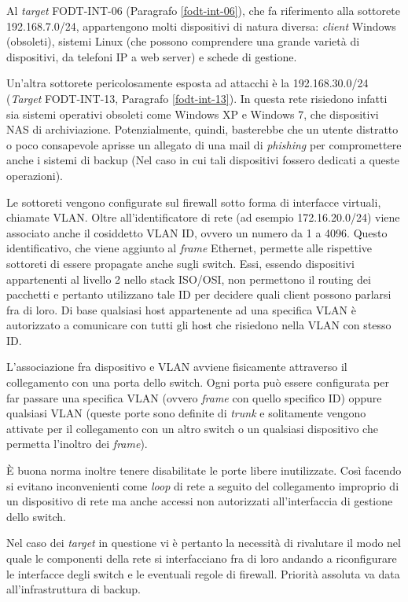 \documentclass[target=bach,aauheader=]{thud}
\begin{document}
Al \textit{target} FODT-INT-06 (Paragrafo \ref{fodt-int-06}), che fa riferimento alla sottorete 192.168.7.0/24, appartengono molti dispositivi di natura diversa: \textit{client} Windows (obsoleti), sistemi Linux (che possono comprendere una grande varietà di dispositivi, da telefoni IP a web server) e schede di gestione.

Un'altra sottorete pericolosamente esposta ad attacchi è la 192.168.30.0/24 (\textit{Target} FODT-INT-13, Paragrafo \ref{fodt-int-13}). In questa rete risiedono infatti sia sistemi operativi obsoleti come Windows XP e Windows 7, che dispositivi NAS di archiviazione. Potenzialmente, quindi, basterebbe che un utente distratto o poco consapevole aprisse un allegato di una mail di \textit{phishing} per compromettere anche i sistemi di backup (Nel caso in cui tali dispositivi fossero dedicati a queste operazioni).

Le sottoreti vengono configurate sul firewall sotto forma di interfacce virtuali, chiamate VLAN. Oltre all'identificatore di rete (ad esempio 172.16.20.0/24) viene associato anche il cosiddetto VLAN ID, ovvero un numero da 1 a 4096. Questo identificativo, che viene aggiunto al \textit{frame} Ethernet, permette alle rispettive sottoreti di essere propagate anche sugli switch. Essi, essendo dispositivi appartenenti al livello 2 nello stack ISO/OSI, non permettono il routing dei pacchetti e pertanto utilizzano tale ID per decidere quali client possono parlarsi fra di loro. Di base qualsiasi host appartenente ad una specifica VLAN è autorizzato a comunicare con tutti gli host che risiedono nella VLAN con stesso ID.

L'associazione fra dispositivo e VLAN avviene fisicamente attraverso il collegamento con una porta dello switch. Ogni porta può essere configurata per far passare una specifica VLAN (ovvero \textit{frame} con quello specifico ID) oppure qualsiasi VLAN (queste porte sono definite di \textit{trunk} e solitamente vengono attivate per il collegamento con un altro switch o un qualsiasi dispositivo che permetta l'inoltro dei \textit{frame}).

È buona norma inoltre tenere disabilitate le porte libere inutilizzate. Così facendo si evitano inconvenienti come \textit{loop} di rete a seguito del collegamento improprio di un dispositivo di rete ma anche accessi non autorizzati all'interfaccia di gestione dello switch. 

Nel caso dei \textit{target} in questione vi è pertanto la necessità di rivalutare il modo nel quale le componenti della rete si interfacciano fra di loro andando a riconfigurare le interfacce degli switch e le eventuali regole di firewall. Priorità assoluta va data all'infrastruttura di backup.
\end{document}
